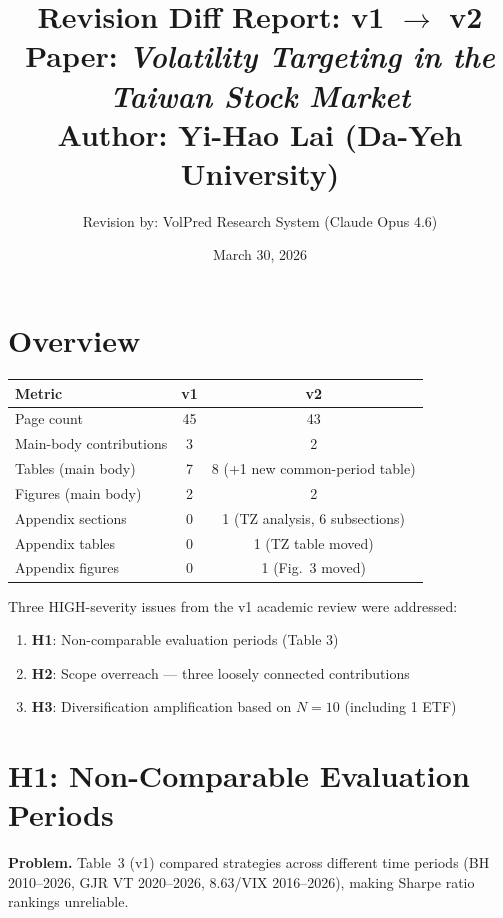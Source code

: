 \documentclass[12pt,a4paper]{article}
\title{Revision Diff Report: v1 $\to$ v2\\[6pt]
\large Paper: \textit{Volatility Targeting in the Taiwan Stock Market}\\[4pt]
\normalsize Author: Yi-Hao Lai (Da-Yeh University)}
\author{Revision by: VolPred Research System (Claude Opus 4.6)}
\date{March 30, 2026}
\begin{document}
\maketitle

\section{Overview}

\begin{center}
\begin{tabular}{lcc}
\toprule
Metric & v1 & v2 \\
\midrule
Page count & 45 & 43 \\
Main-body contributions & 3 & 2 \\
Tables (main body) & 7 & 8 (+1 new common-period table) \\
Figures (main body) & 2 & 2 \\
Appendix sections & 0 & 1 (TZ analysis, 6 subsections) \\
Appendix tables & 0 & 1 (TZ table moved) \\
Appendix figures & 0 & 1 (Fig.\ 3 moved) \\
\bottomrule
\end{tabular}
\end{center}

\medskip
\noindent
Three HIGH-severity issues from the v1 academic review were addressed:

\begin{enumerate}
\item \textbf{H1}: Non-comparable evaluation periods (Table 3)
\item \textbf{H2}: Scope overreach --- three loosely connected contributions
\item \textbf{H3}: Diversification amplification based on $N = 10$ (including 1 ETF)
\end{enumerate}

\section{H1: Non-Comparable Evaluation Periods}

\textbf{Problem.} Table~3 (v1) compared strategies across different time periods (BH 2010--2026, GJR VT 2020--2026, 8.63/VIX 2016--2026), making Sharpe ratio rankings unreliable.
\end{document}
